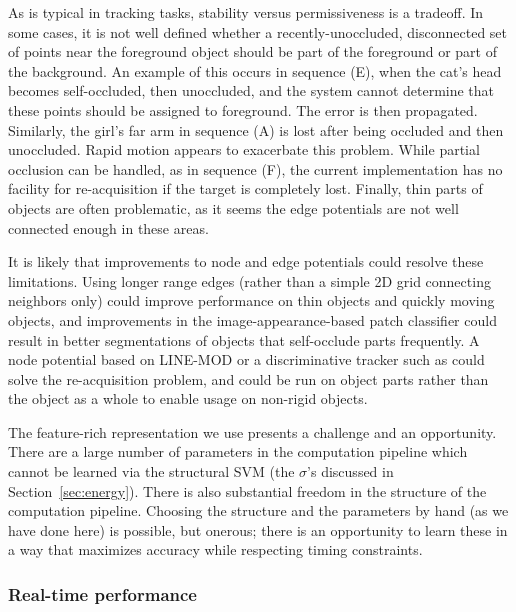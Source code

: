 \documentclass[graybox]{svmult}
\begin{document}
As is typical in tracking tasks, stability versus permissiveness is a tradeoff.  In some cases, it is not well defined whether a recently-unoccluded, disconnected set of points near the foreground object should be part of the foreground or part of the background.  An example of this occurs in sequence (E), when the cat's head becomes self-occluded, then unoccluded, and the system cannot determine that these points should be assigned to foreground.  The error is then propagated.  Similarly, the girl's far arm in sequence (A) is lost after being occluded and then unoccluded.  Rapid motion appears to exacerbate this problem.  While partial occlusion can be handled, as in sequence (F), the current implementation has no facility for re-acquisition if the target is completely lost.  Finally, thin parts of objects are often problematic, as it seems the edge potentials are not well connected enough in these areas.

It is likely that improvements to node and edge potentials could resolve these limitations.  Using longer range edges (rather than a simple 2D grid connecting neighbors only) could improve performance on thin objects and quickly moving objects, and improvements in the image-appearance-based patch classifier could result in better segmentations of objects that self-occlude parts frequently.  A node potential based on LINE-MOD or a discriminative tracker such as \cite{kalal2010a} could solve the re-acquisition problem, and could be run on object parts rather than the object as a whole to enable usage on non-rigid objects.

The feature-rich representation we use presents a challenge and an opportunity.  There are a large number of parameters in the computation pipeline which cannot be learned via the structural SVM (\eg the $\sigma$'s discussed in Section~\ref{sec:energy}). There is also substantial freedom in the structure of the computation pipeline.  Choosing the structure and the parameters by hand (as we have done here) is possible, but onerous; there is an opportunity to learn these in a way that maximizes accuracy while respecting timing constraints.


\subsubsection{Real-time performance}
\label{sec:realtime}
\end{document}
